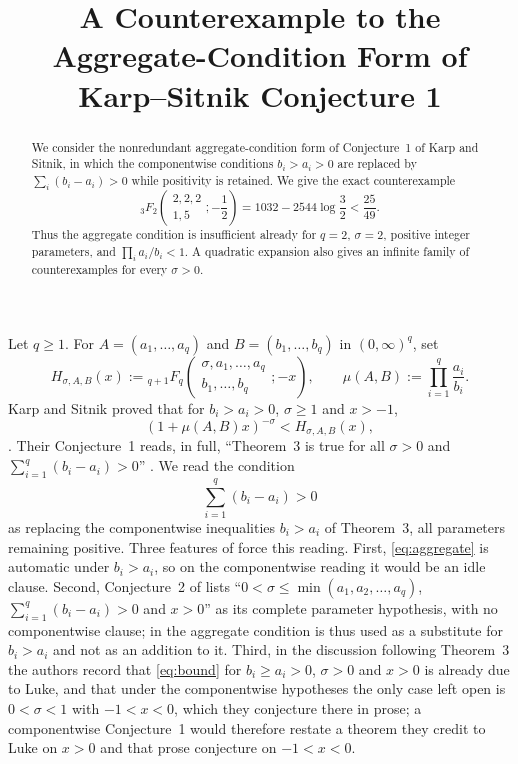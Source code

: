 \documentclass[11pt]{amsart}
\title{A Counterexample to the Aggregate-Condition Form of
Karp--Sitnik Conjecture 1}
\date{}
\begin{document}
\begin{abstract}
We consider the nonredundant aggregate-condition form of Conjecture~1 of
Karp and Sitnik, in which the componentwise conditions $b_i>a_i>0$ are
replaced by $\sum_i(b_i-a_i)>0$ while positivity is retained. We give the
exact counterexample
\[
 {}_3F_2\!\left(
 \begin{matrix}2,2,2\\1,5\end{matrix};-\frac12
 \right)
 =1032-2544\log\frac32<\frac{25}{49}.
\]
Thus the aggregate condition is insufficient already for $q=2$, $\sigma=2$,
positive integer parameters, and $\prod_i a_i/b_i<1$. A quadratic expansion
also gives an infinite family of counterexamples for every $\sigma>0$.
\end{abstract}

\maketitle

Let $q\ge1$. For $A=(a_1,\ldots,a_q)$ and $B=(b_1,\ldots,b_q)$ in
$(0,\infty)^q$, set
\[
 H_{\sigma,A,B}(x)
 :=
 {}_{q+1}F_q\!\left(
 \begin{matrix}
 \sigma,a_1,\ldots,a_q\\
 b_1,\ldots,b_q
 \end{matrix};-x
 \right),
 \qquad
 \mu(A,B):=\prod_{i=1}^q\frac{a_i}{b_i}.
\]
Karp and Sitnik proved that for $b_i>a_i>0$, $\sigma\ge1$ and $x>-1$,
\begin{equation}\label{eq:bound}
 (1+\mu(A,B)x)^{-\sigma}<H_{\sigma,A,B}(x),
\end{equation}
\cite[Theorem~3]{KS}. Their Conjecture~1 reads, in full, ``Theorem~3 is
true for all $\sigma>0$ and $\sum_{i=1}^{q}(b_i-a_i)>0$''
\cite[Conjecture~1]{KS}. We read the condition
\begin{equation}\label{eq:aggregate}
 \sum_{i=1}^q(b_i-a_i)>0
\end{equation}
as replacing the componentwise inequalities $b_i>a_i$ of Theorem~3, all
parameters remaining positive. Three features of \cite{KS} force this
reading. First, \eqref{eq:aggregate} is automatic under $b_i>a_i$, so on
the componentwise reading it would be an idle clause. Second, Conjecture~2
of \cite{KS} lists ``$0<\sigma\le\min(a_1,a_2,\ldots,a_q)$,
$\sum_{i=1}^{q}(b_i-a_i)>0$ and $x>0$'' as its complete parameter
hypothesis, with no componentwise clause; in \cite{KS} the aggregate
condition is thus used as a substitute for $b_i>a_i$ and not as an addition
to it. Third, in the discussion following Theorem~3 the authors record that
\eqref{eq:bound} for $b_i\ge a_i>0$, $\sigma>0$ and $x>0$ is already due to
Luke, and that under the componentwise hypotheses the only case left open
is $0<\sigma<1$ with $-1<x<0$, which they conjecture there in prose; a
componentwise Conjecture~1 would therefore restate a theorem they credit to
Luke on $x>0$ and that prose conjecture on $-1<x<0$.
\end{document}
